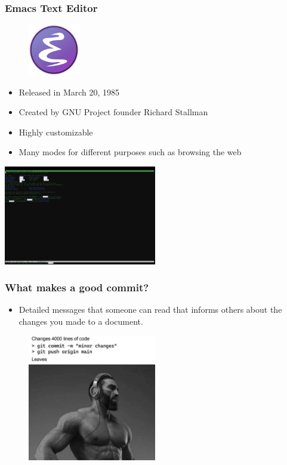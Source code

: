 \documentclass{beamer}
\begin{document}
\begin{frame}
	\frametitle{\textbf{Emacs Text Editor}}
		
	\begin{multicols}{2}
		\begin{figure}[h]
			\centering
			\includegraphics[width=0.2\textwidth]{img/Emacs_logo.png} 
		\end{figure}

		\begin{itemize}
			\item Released in March 20, 1985
			\item Created by GNU Project founder Richard Stallman
			\item Highly customizable
			\item Many modes for different purposes such as browsing the web
		\end{itemize}

		\includegraphics[width=0.5\textwidth]{img/Emacs.png} 
	\end{multicols}
\end{frame}

\begin{frame}
	\frametitle{\textbf{What makes a good commit?}}
	
	\begin{itemize}
		\item Detailed messages that someone can read that informs others about the
changes you made to a document. 
	\end{itemize}

	\begin{figure}[h]	
		\centering
		\includegraphics[width=0.5\textwidth]{img/minorchanges.jpeg} 
	\end{figure}

\end{frame}
\end{document}

